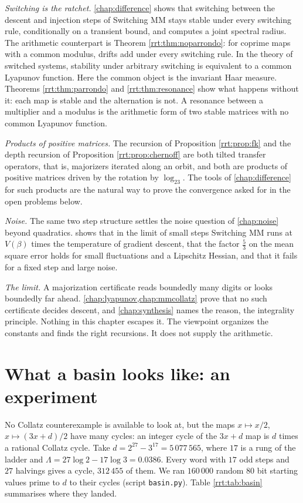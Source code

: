 \emph{Switching is the ratchet.} \cref{chap:difference} shows that switching between the descent and injection steps of Switching MM stays stable under every switching rule, conditionally on a transient bound, and computes a joint spectral radius. The arithmetic counterpart is Theorem \ref{rrt:thm:noparrondo}: for coprime maps with a common modulus, drifts add under every switching rule. In the theory of switched systems, stability under arbitrary switching is equivalent to a common Lyapunov function. Here the common object is the invariant Haar measure. Theorems \ref{rrt:thm:parrondo} and \ref{rrt:thm:resonance} show what happens without it: each map is stable and the alternation is not. A resonance between a multiplier and a modulus is the arithmetic form of two stable matrices with no common Lyapunov function.

\emph{Products of positive matrices.} The recursion of Proposition \ref{rrt:prop:fk} and the depth recursion of Proposition \ref{rrt:prop:chernoff} are both tilted transfer operators, that is, majorizers iterated along an orbit, and both are products of positive matrices driven by the rotation by $\log_23$. The tools of \cref{chap:difference} for such products are the natural way to prove the convergence asked for in the open problems below.

\emph{Noise.} The same two step structure settles the noise question of \cref{chap:noise} beyond quadratics.  shows that in the limit of small steps Switching MM runs at $V(\beta)$ times the temperature of gradient descent, that the factor $\tfrac53$ on the mean square error holds for small fluctuations and a Lipschitz Hessian, and that it fails for a fixed step and large noise.

\emph{The limit.} A majorization certificate reads boundedly many digits or looks boundedly far ahead. \cref{chap:lyapunov,chap:mmcollatz} prove that no such certificate decides descent, and \cref{chap:synthesis} names the reason, the integrality principle. Nothing in this chapter escapes it. The viewpoint organizes the constants and finds the right recursions. It does not supply the arithmetic.


\section{What a basin looks like: an experiment}\label{rrt:sec:basin}

No Collatz counterexample is available to look at, but the maps $x\mapsto x/2$, $x\mapsto(3x+d)/2$ have many cycles: an integer cycle of the $3x+d$ map is $d$ times a rational Collatz cycle. Take $d=2^{27}-3^{17}=5\,077\,565$, where $17$ is a rung of the ladder and $\Lambda=27\log2-17\log3=0.0386$. Every word with $17$ odd steps and $27$ halvings gives a cycle, $312\,455$ of them. We ran $160\,000$ random $80$ bit starting values prime to $d$ to their cycles (script \texttt{basin.py}). Table \ref{rrt:tab:basin} summarises where they landed.

